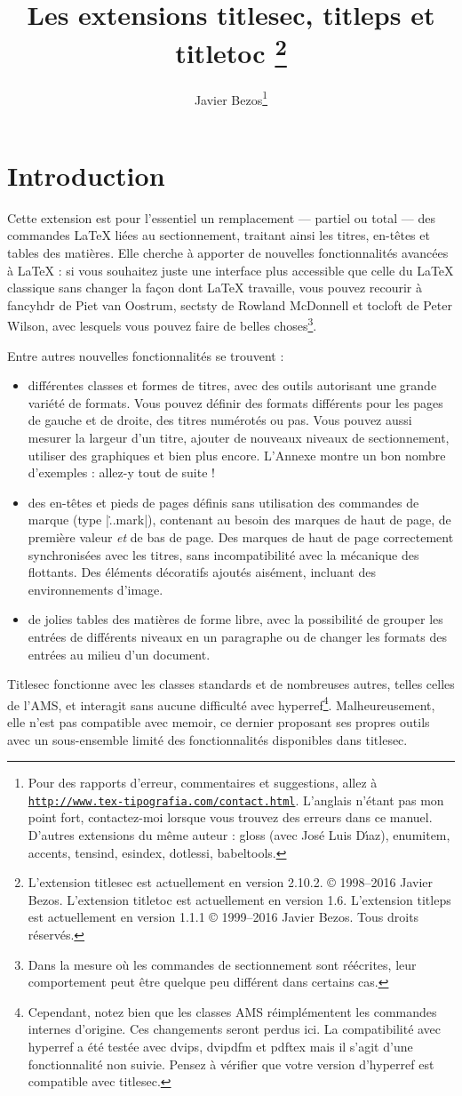 \documentclass[a4paper]{ltxguide}
\title{Les extensions \textsf{titlesec}, \textsf{titleps} et \textsf{titletoc} 
\footnote{L'extension \textsf{titlesec} est actuellement en version 2.10.2.  
\copyright{} 1998--2016 Javier Bezos. L'extension \textsf{titletoc} est
actuellement en version 1.6. L'extension \textsf{titleps} est actuellement en
version 1.1.1 \copyright{} 1999--2016 Javier Bezos. Tous droits réservés.}}
\author{Javier Bezos\footnote{Pour des rapports d'erreur, commentaires et 
suggestions, allez à \href{http://www.tex-tipografia.com/contact.html}%
{\texttt{http://www.tex-tipografia.com/contact.html}}.  L'anglais n'étant pas
mon point fort, contactez-moi lorsque vous trouvez des erreurs dans ce manuel.  
D'autres extensions du même auteur : \textsf{gloss} (avec Jos\'e Luis 
D\'{\i}az), \textsf{enumitem, accents, tensind, esindex, dotlessi, 
babeltools}.}}
\date{\docdate}
\begin{document}
\maketitle
\tableofcontents
\section{Introduction}

Cette extension est pour l'essentiel un remplacement --- partiel ou total ---
des commandes \LaTeX{} liées au sectionnement, traitant ainsi les titres, 
en-têtes et tables des matières. Elle cherche à apporter de nouvelles
fonctionnalités avancées à \LaTeX{} : si vous souhaitez juste une interface
plus accessible que celle du \LaTeX{} classique sans changer la façon dont
\LaTeX{} travaille, vous pouvez recourir à \textsf{fancyhdr} de Piet van 
Oostrum, \textsf{sectsty} de Rowland McDonnell et \textsf{tocloft} de Peter
Wilson, avec lesquels vous pouvez faire de belles choses\footnote{Dans la
mesure où les commandes de sectionnement sont réécrites, leur comportement peut
être quelque peu différent dans certains cas.}.

Entre autres nouvelles fonctionnalités se trouvent :
\begin{itemize}
\item différentes classes et \og formes\fg{} de titres, avec des outils
autorisant une grande variété de formats. Vous pouvez définir des formats
différents pour les pages de gauche et de droite, des titres numérotés ou pas.
Vous pouvez aussi mesurer la largeur d'un titre, ajouter de nouveaux niveaux
de sectionnement, utiliser des graphiques et bien plus encore. L'Annexe montre
un bon nombre d'exemples : allez-y tout de suite !

\item des en-têtes et pieds de pages définis sans utilisation des commandes de
marque (type |\...mark|), contenant au besoin des marques de haut de page, de
première valeur \emph{et} de bas de page. Des marques de haut de page
correctement synchronisées avec les titres, sans incompatibilité avec la
mécanique des flottants. Des éléments décoratifs ajoutés aisément, incluant des
environnements d'image.

\item de jolies tables des matières de forme libre, avec la possibilité de
grouper les entrées de différents niveaux en un paragraphe ou de changer les
formats des entrées au milieu d'un document. 
\end{itemize}
\textsf{Titlesec} fonctionne avec les classes standards et de nombreuses
autres, telles celles de l'AMS, et interagit sans aucune difficulté avec 
\textsf{hyperref}\footnote{Cependant, notez bien que les classes AMS
réimplémentent les commandes internes d'origine. Ces changements seront perdus
ici. La compatibilité avec \textsf{hyperref} a été testée avec \textsf{dvips}, 
\textsf{dvipdfm} et \textsf{pdftex} mais il s'agit d'une fonctionnalité non 
suivie. Pensez à vérifier que votre version d'\textsf{hyperref} est compatible 
avec \textsf{titlesec}.}. Malheureusement, elle n'est pas compatible avec 
\textsf{memoir}, ce dernier proposant ses propres outils avec un sous-ensemble
limité des fonctionnalités disponibles dans \textsf{titlesec}.
\end{document}
